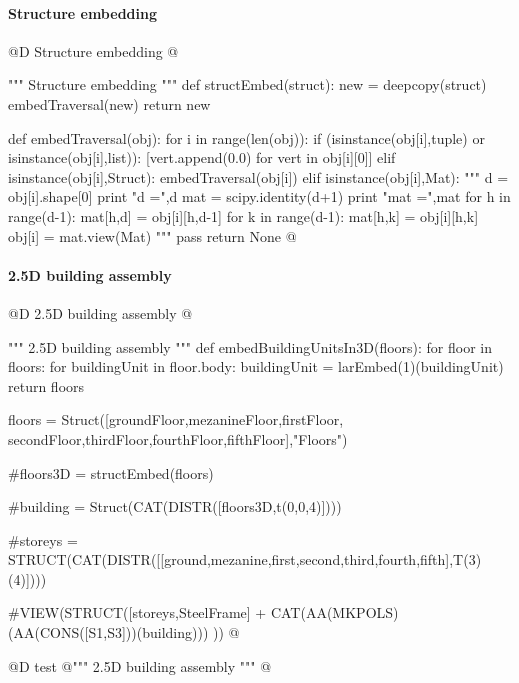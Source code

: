 \documentclass[11pt,oneside]{article}    %
\begin{document}
\paragraph{Structure embedding}
@D Structure embedding 
@{""" Structure embedding """
def structEmbed(struct):
    new = deepcopy(struct)
    embedTraversal(new) 
    return new
    
def embedTraversal(obj):
    for i in range(len(obj)):
        if (isinstance(obj[i],tuple) or isinstance(obj[i],list)):
            [vert.append(0.0) for vert in obj[i][0]]
        elif isinstance(obj[i],Struct):
            embedTraversal(obj[i])
        elif isinstance(obj[i],Mat): 
            """
            d = obj[i].shape[0]
            print "d =",d
            mat = scipy.identity(d+1)
            print "mat =",mat
            for h in range(d-1):
                mat[h,d] = obj[i][h,d-1]
                for k in range(d-1):
                    mat[h,k] = obj[i][h,k]
            obj[i] = mat.view(Mat)
            """
            pass
    return None    
@}



\paragraph{2.5D building assembly}
@D 2.5D building assembly
@{""" 2.5D building assembly """
def embedBuildingUnitsIn3D(floors):
    for floor in floors:
        for buildingUnit in floor.body:
            buildingUnit = larEmbed(1)(buildingUnit)
    return floors
        
floors = Struct([groundFloor,mezanineFloor,firstFloor,
                secondFloor,thirdFloor,fourthFloor,fifthFloor],"Floors")

#floors3D = structEmbed(floors)

#building = Struct(CAT(DISTR([floors3D,t(0,0,4)])))



#storeys = STRUCT(CAT(DISTR([[ground,mezanine,first,second,third,fourth,fifth],T(3)(4)])))

#VIEW(STRUCT([storeys,SteelFrame] + CAT(AA(MKPOLS)(AA(CONS([S1,S3]))(building))) ))
@}

@D test
@{""" 2.5D building assembly """
%
@}
\end{document}
